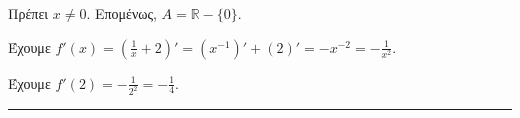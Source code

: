 \begin{alist}
    \item Πρέπει $x \neq 0$. Επομένως, $A = \mathbb{R} - \{0\}$.
    \item Έχουμε $f'(x) = \left( \frac{1}{x} + 2 \right)' = (x^{-1})' + (2)' = -x^{-2} = -\frac{1}{x^2}$.
    \item Έχουμε $f'(2) = -\frac{1}{2^2} = -\frac{1}{4}$.
\end{alist}
\vspace{6mm}
\noindent\rule{\textwidth}{0.4pt}
\vspace{6mm}

